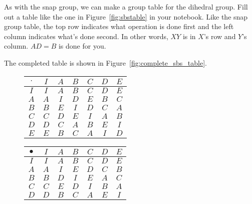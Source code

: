 \documentclass[../key.tex]{subfiles}
\begin{document}
\begin{outer_problem}
\item As with the snap group, we can make a group table for the dihedral group. Fill out a table like the one in Figure~\ref{fig:sbstable} in your notebook. Like the snap group table, the top row indicates what operation is done first and the left column indicates what's done second. In other words, $XY$ is in $X$'s row and $Y$'s column. $AD=B$ is done for you.
\end{outer_problem}

\noindent The completed table is shown in Figure~\ref{fig:complete_sbs_table}.

\begin{figure}[h]
	\begin{center}
		\begin{minipage}[b]{0.45\textwidth}
			\centering
			\begin{tabular}{c|cccccc}
				\hline
				$\cdot$ & $I$ & $A$ & $B$ & $C$ & $D$ & $E$ \\ \hline
				\rowcolor{light-gray}
				$I$ & $I$ & $A$ & $B$ & $C$ & $D$ & $E$ \\
				$A$ & $A$ & $I$ & $D$ & $E$ & $B$ & $C$ \\
				\rowcolor{light-gray}
				$B$ & $B$ & $E$ & $I$ & $D$ & $C$ & $A$ \\
				$C$ & $C$ & $D$ & $E$ & $I$ & $A$ & $B$ \\
				\rowcolor{light-gray}
				$D$ & $D$ & $C$ & $A$ & $B$ & $E$ & $I$ \\
				$E$ & $E$ & $B$ & $C$ & $A$ & $I$ & $D$ \\ \hline
			\end{tabular}
			\vspace*{0.5\baselineskip}
		\end{minipage}
		\hfill
		\begin{minipage}[b]{0.45\textwidth}
			\centering
			\begin{tabular}{c|cccccc}
				\hline
				$\bullet$ & $I$ & $A$ & $B$ & $C$ & $D$ & $E$ \\ \hline
				\rowcolor{light-gray}
				$I$ & $I$ & $A$ & $B$ & $C$ & $D$ & $E$ \\
				$A$ & $A$ & $I$ & $E$ & $D$ & $C$ & $B$ \\
				\rowcolor{light-gray}
				$B$ & $B$ & $D$ & $I$ & $E$ & $A$ & $C$ \\
				$C$ & $C$ & $E$ & $D$ & $I$ & $B$ & $A$ \\
				\rowcolor{light-gray}
				$D$ & $D$ & $B$ & $C$ & $A$ & $E$ & $I$ \\

\end{tabular}
\end{minipage}
\end{center}
\end{figure}
\end{document}
